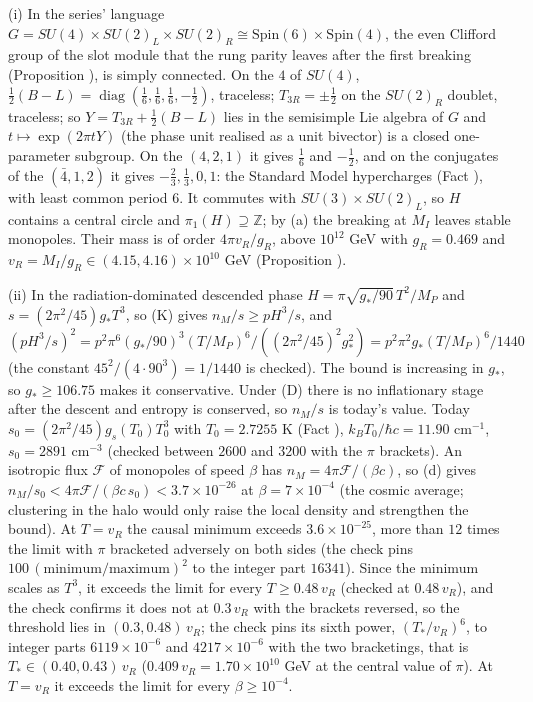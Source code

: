 (i) In the series' language $G = SU(4) \times SU(2)_{L} \times SU(2)_{R} \cong \mathrm{Spin}(6) \times \mathrm{Spin}(4)$, the even Clifford group of the slot module that the rung parity leaves after the first breaking (Proposition ), is simply connected. On the $4$ of $SU(4)$, $\tfrac12(B - L) = \operatorname{diag}(\tfrac16, \tfrac16, \tfrac16, -\tfrac12)$, traceless; $T_{3R} = \pm\tfrac12$ on the $SU(2)_{R}$ doublet, traceless; so $Y = T_{3R} + \tfrac12(B - L)$ lies in the semisimple Lie algebra of $G$ and $t \mapsto \exp(2\pi tY)$ (the phase unit realised as a unit bivector) is a closed one-parameter subgroup. On the $(4,2,1)$ it gives $\tfrac16$ and $-\tfrac12$, and on the conjugates of the $(\bar 4,1,2)$ it gives $-\tfrac23, \tfrac13, 0, 1$: the Standard Model hypercharges (Fact ), with least common period $6$. It commutes with $SU(3) \times SU(2)_{L}$, so $H$ contains a central circle and $\pi_{1}(H) \supseteq \mathbb{Z}$; by (a) the breaking at $M_{I}$ leaves stable monopoles. Their mass is of order $4\pi v_{R}/g_{R}$, above $10^{12}$ GeV with $g_{R} = 0.469$ and $v_{R} = M_{I}/g_{R} \in (4.15, 4.16) \times 10^{10}$ GeV (Proposition ).

(ii) In the radiation-dominated descended phase $H = \pi\sqrt{g_{*}/90}\,T^{2}/M_{P}$ and $s = (2\pi^{2}/45)g_{*}T^{3}$, so (K) gives $n_{M}/s \ge pH^{3}/s$, and $(pH^{3}/s)^{2} = p^{2}\pi^{6}(g_{*}/90)^{3}(T/M_{P})^{6}/((2\pi^{2}/45)^{2}g_{*}^{2}) = p^{2}\pi^{2}g_{*}(T/M_{P})^{6}/1440$ (the constant $45^{2}/(4 \cdot 90^{3}) = 1/1440$ is checked). The bound is increasing in $g_{*}$, so $g_{*} \ge 106.75$ makes it conservative. Under (D) there is no inflationary stage after the descent and entropy is conserved, so $n_{M}/s$ is today's value. Today $s_{0} = (2\pi^{2}/45)g_{s}(T_{0})T_{0}^{3}$ with $T_{0} = 2.7255$ K (Fact ), $k_{B}T_{0}/\hbar c = 11.90$ cm$^{-1}$, $s_{0} = 2891$ cm$^{-3}$ (checked between $2600$ and $3200$ with the $\pi$ brackets). An isotropic flux $\mathcal{F}$ of monopoles of speed $\beta$ has $n_{M} = 4\pi\mathcal{F}/(\beta c)$, so (d) gives $n_{M}/s_{0} < 4\pi\mathcal{F}/(\beta c\,s_{0}) < 3.7 \times 10^{-26}$ at $\beta = 7 \times 10^{-4}$ (the cosmic average; clustering in the halo would only raise the local density and strengthen the bound). At $T = v_{R}$ the causal minimum exceeds $3.6 \times 10^{-25}$, more than $12$ times the limit with $\pi$ bracketed adversely on both sides (the check pins $100\,(\text{minimum}/\text{maximum})^{2}$ to the integer part $16341$). Since the minimum scales as $T^{3}$, it exceeds the limit for every $T \ge 0.48\,v_{R}$ (checked at $0.48\,v_{R}$), and the check confirms it does not at $0.3\,v_{R}$ with the brackets reversed, so the threshold lies in $(0.3, 0.48)\,v_{R}$; the check pins its sixth power, $(T_{*}/v_{R})^{6}$, to integer parts $6119 \times 10^{-6}$ and $4217 \times 10^{-6}$ with the two bracketings, that is $T_{*} \in (0.40, 0.43)\,v_{R}$ ($0.409\,v_{R} = 1.70 \times 10^{10}$ GeV at the central value of $\pi$). At $T = v_{R}$ it exceeds the limit for every $\beta \ge 10^{-4}$.

